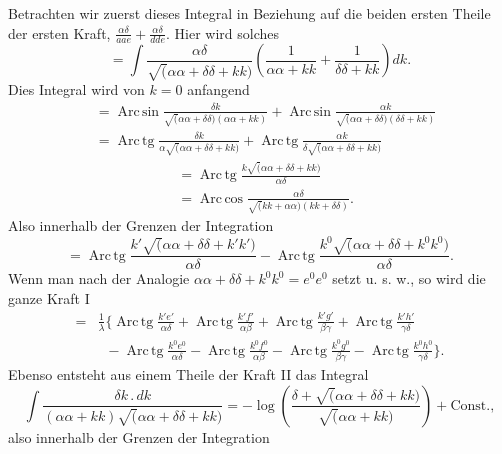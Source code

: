 Betrachten wir zuerst dieses Integral in Beziehung auf die beiden ersten Theile der ersten Kraft, $\frac{\alpha\delta}{aae}+\frac{\alpha\delta}{dde}$. Hier wird solches
\[
=\int\frac{\alpha\delta}{\surd(\alpha\alpha+\delta\delta+kk)}\left(\frac{1}{\alpha\alpha+kk}+\frac{1}{\delta\delta+kk}\right)dk.
\]
\noindent Dies Integral wird von $k=0$ anfangend
\[
\begin{aligned}
&=\operatorname{Arc\,sin}\frac{\delta k}{\surd(\alpha\alpha+\delta\delta)(\alpha\alpha+kk)}+\operatorname{Arc\,sin}\frac{\alpha k}{\surd(\alpha\alpha+\delta\delta)(\delta\delta+kk)}\\[5pt]
&=\operatorname{Arc\,tg}\frac{\delta k}{\alpha\surd(\alpha\alpha+\delta\delta+kk)}+\operatorname{Arc\,tg}\frac{\alpha k}{\delta\surd(\alpha\alpha+\delta\delta+kk)}
\end{aligned}
\]
\clearpage{}
\[
\begin{aligned}
&=\operatorname{Arc\,tg}\frac{k\surd(\alpha\alpha+\delta\delta+kk)}{\alpha\delta}\\[5pt]
&=\operatorname{Arc\,cos}\frac{\alpha\delta}{\surd(kk+\alpha\alpha)(kk+\delta\delta)}.
\end{aligned}
\]
\noindent Also innerhalb der Grenzen der Integration
\[
=\operatorname{Arc\,tg}\frac{k'\surd(\alpha\alpha+\delta\delta+k'k')}{\alpha\delta}-\operatorname{Arc\,tg}\frac{k^0\surd(\alpha\alpha+\delta\delta+k^0k^0)}{\alpha\delta}.
\]
\noindent Wenn man nach der Analogie $\alpha\alpha+\delta\delta+k^0k^0=e^0e^0$ setzt u. s. w., so wird die ganze Kraft I
\[
\begin{aligned}
={}&\frac{1}{\lambda}\biggl\{\operatorname{Arc\,tg}\frac{k'e'}{\alpha\delta}+\operatorname{Arc\,tg}\frac{k'f'}{\alpha\beta}+\operatorname{Arc\,tg}\frac{k'g'}{\beta\gamma}+\operatorname{Arc\,tg}\frac{k'h'}{\gamma\delta}\\[5pt]
&\phantom{\frac{1}{\lambda}}-\operatorname{Arc\,tg}\frac{k^0e^0}{\alpha\delta}-\operatorname{Arc\,tg}\frac{k^0f^0}{\alpha\beta}-\operatorname{Arc\,tg}\frac{k^0g^0}{\beta\gamma}-\operatorname{Arc\,tg}\frac{k^0h^0}{\gamma\delta}\biggr\}.
\end{aligned}
\]
\noindent Ebenso entsteht aus einem Theile der Kraft II das Integral
\[
\int\frac{\delta k\mathbin{.}dk}{(\alpha\alpha+kk)\surd(\alpha\alpha+\delta\delta+kk)}=-\log\left(\frac{\delta+\surd(\alpha\alpha+\delta\delta+kk)}{\surd(\alpha\alpha+kk)}\right)+\text{Const.},
\]
\noindent also innerhalb der Grenzen der Integration
